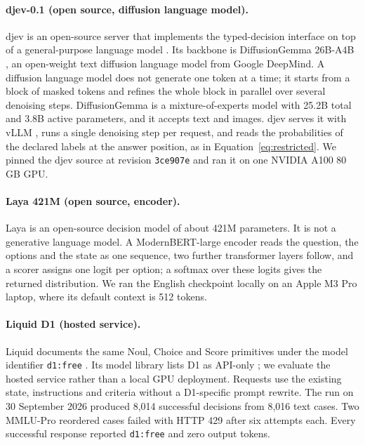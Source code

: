 \paragraph{djev-0.1 (open source, diffusion language model).} djev is an
open-source server that implements the typed-decision interface on top of a
general-purpose language model \citep{djev2026}. Its backbone is DiffusionGemma
26B-A4B \citep{diffusiongemma2026}, an open-weight text diffusion language model
from Google DeepMind. A diffusion language model does not generate one token at a
time; it starts from a block of masked tokens and refines the whole block in
parallel over several denoising steps. DiffusionGemma is a mixture-of-experts
model with 25.2B total and 3.8B active parameters, and it accepts text and
images. djev serves it with vLLM \citep{kwon2023vllm}, runs a single denoising
step per request, and reads the probabilities of the declared labels at the
answer position, as in Equation~\eqref{eq:restricted}. We pinned the djev source
at revision \texttt{3ce907e} and ran it on one NVIDIA A100 80\,GB GPU.

\paragraph{Laya 421M (open source, encoder).} Laya \citep{laya2026} is an
open-source decision model of about 421M parameters. It is not a generative
language model. A ModernBERT-large encoder \citep{warner2024modernbert} reads the
question, the options and the state as one sequence, two further transformer
layers follow, and a scorer assigns one logit per option; a softmax over these
logits gives the returned distribution. We ran the English checkpoint locally on
an Apple M3 Pro laptop, where its default context is 512 tokens.

\paragraph{Liquid D1 (hosted service).} Liquid documents the same Noul, Choice
and Score primitives under the model identifier \texttt{d1:free}
\citep{liquid2026decisions}. Its model library lists D1 as API-only
\citep{liquid2026library}; we evaluate the hosted service rather than a local
GPU deployment. Requests use the existing state, instructions and criteria
without a D1-specific prompt rewrite. The run on 30 September 2026 produced
8{,}014 successful decisions from 8{,}016 text cases. Two MMLU-Pro reordered
cases failed with HTTP 429 after six attempts each. Every successful response
reported \texttt{d1:free} and zero output tokens.

